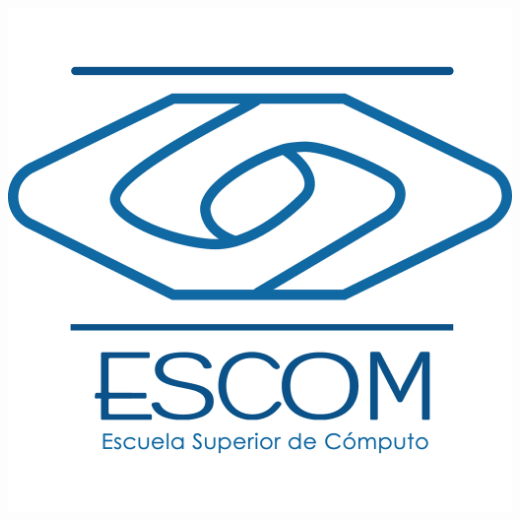 \begin{center}
\begin{minipage}{0.48\textwidth}
\begin{flushright}
\includegraphics[scale = 0.08]{images/escom.png}


\end{flushright}
\end{minipage}
\end{center}
